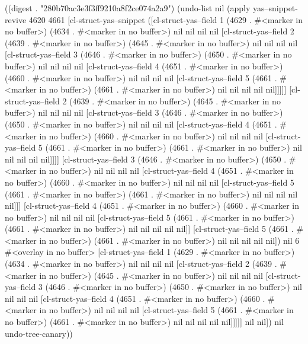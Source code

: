 
((digest . "280b70ac3e3f3ff9210a8f2ce074a2a9") (undo-list nil (apply yas--snippet-revive 4620 4661 [cl-struct-yas--snippet ([cl-struct-yas--field 1 (4629 . #<marker in no buffer>) (4634 . #<marker in no buffer>) nil nil nil nil [cl-struct-yas--field 2 (4639 . #<marker in no buffer>) (4645 . #<marker in no buffer>) nil nil nil nil [cl-struct-yas--field 3 (4646 . #<marker in no buffer>) (4650 . #<marker in no buffer>) nil nil nil nil [cl-struct-yas--field 4 (4651 . #<marker in no buffer>) (4660 . #<marker in no buffer>) nil nil nil nil [cl-struct-yas--field 5 (4661 . #<marker in no buffer>) (4661 . #<marker in no buffer>) nil nil nil nil nil]]]]] [cl-struct-yas--field 2 (4639 . #<marker in no buffer>) (4645 . #<marker in no buffer>) nil nil nil nil [cl-struct-yas--field 3 (4646 . #<marker in no buffer>) (4650 . #<marker in no buffer>) nil nil nil nil [cl-struct-yas--field 4 (4651 . #<marker in no buffer>) (4660 . #<marker in no buffer>) nil nil nil nil [cl-struct-yas--field 5 (4661 . #<marker in no buffer>) (4661 . #<marker in no buffer>) nil nil nil nil nil]]]] [cl-struct-yas--field 3 (4646 . #<marker in no buffer>) (4650 . #<marker in no buffer>) nil nil nil nil [cl-struct-yas--field 4 (4651 . #<marker in no buffer>) (4660 . #<marker in no buffer>) nil nil nil nil [cl-struct-yas--field 5 (4661 . #<marker in no buffer>) (4661 . #<marker in no buffer>) nil nil nil nil nil]]] [cl-struct-yas--field 4 (4651 . #<marker in no buffer>) (4660 . #<marker in no buffer>) nil nil nil nil [cl-struct-yas--field 5 (4661 . #<marker in no buffer>) (4661 . #<marker in no buffer>) nil nil nil nil nil]] [cl-struct-yas--field 5 (4661 . #<marker in no buffer>) (4661 . #<marker in no buffer>) nil nil nil nil nil]) nil 6 #<overlay in no buffer> [cl-struct-yas--field 1 (4629 . #<marker in no buffer>) (4634 . #<marker in no buffer>) nil nil nil nil [cl-struct-yas--field 2 (4639 . #<marker in no buffer>) (4645 . #<marker in no buffer>) nil nil nil nil [cl-struct-yas--field 3 (4646 . #<marker in no buffer>) (4650 . #<marker in no buffer>) nil nil nil nil [cl-struct-yas--field 4 (4651 . #<marker in no buffer>) (4660 . #<marker in no buffer>) nil nil nil nil [cl-struct-yas--field 5 (4661 . #<marker in no buffer>) (4661 . #<marker in no buffer>) nil nil nil nil nil]]]]] nil nil]) nil undo-tree-canary))
